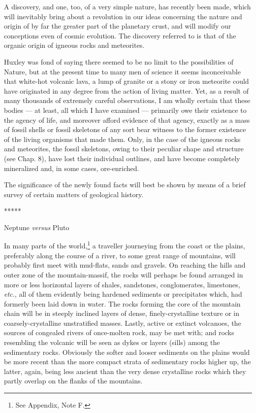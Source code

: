 \documentclass[a4paper, 12pt, oneside, landscape]{article}
\begin{document}
A discovery, and one, too, of a very simple nature, has recently been made, which will inevitably bring about a revolution in our ideas concerning the nature and origin of by far the greater part of the planetary crust, and will modify our conceptions even of cosmic evolution. The discovery referred to is that of the organic origin of igneous rocks and meteorites.

Huxley was fond of saying there seemed to be no limit to the possibilities of Nature, but at the present time to many men of science it seems inconceivable that white-hot volcanic lava, a lump of granite or a stony or iron meteorite could have originated in any degree from the action of living matter. Yet, as a result of many thousands of extremely careful observations, I am wholly certain that these bodies --- at least, all which I have examined --- primarily owe their existence to the agency of life, and moreover afford evidence of that agency, exactly as a mass of fossil shells or fossil skeletons of any sort bear witness to the former existence of the living organisms that made them. Only, in the case of the igneous rocks and meteorites, the fossil skeletons, owing to their peculiar shape and structure (see Chap. 8), have lost their individual outlines, and have become completely mineralized and, in some cases, ore-enriched.

The significance of the newly found facts will best be shown by means of a brief survey of certain matters of geological history.

\centerline{*\hspace{15mm}*\hspace{15mm}*\hspace{15mm}*\hspace{15mm}*}
\bigskip

\centerline{Neptune \emph{versus} Pluto}

In many parts of the world,\footnote{See Appendix, Note F.} a traveller journeying from the coast or the plains, preferably along the course of a river, to some great range of mountains, will probably first meet with mud-flats, sands and gravels. On reaching the hills and outer zone of the mountain-massif, the rocks will perhaps be found arranged in more or less horizontal layers of shales, sandstones, conglomerates, limestones, \emph{etc.}, all of them evidently being hardened sediments or precipitates which, had formerly been laid down in water. The rocks forming the core of the mountain chain will be in steeply inclined layers of dense, finely-crystalline texture or in coarsely-crystalline unstratified masses. Lastly, active or extinct volcanoes, the sources of congealed rivers of once-molten rock, may be met with; and rocks resembling the volcanic will be seen as dykes or layers (sills) among the sedimentary rocks. Obviously the softer and looser sediments on the plains would be more recent than the more compact strata of sedimentary rocks higher up, the latter, again, being less ancient than the very dense crystalline rocks which they partly overlap on the flanks of the mountains.
\end{document}
